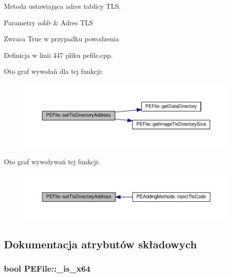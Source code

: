 Metoda ustawiająca adres tablicy T\-L\-S. 


\begin{DoxyParams}{Parametry}
{\em addr} & Adres T\-L\-S \\
\hline
\end{DoxyParams}
\begin{DoxyReturn}{Zwraca}
True w przypadku powodzenia 
\end{DoxyReturn}


Definicja w linii 447 pliku pefile.\-cpp.



Oto graf wywołań dla tej funkcji\-:
\nopagebreak
\begin{figure}[H]
\begin{center}
\leavevmode
\includegraphics[width=350pt]{class_p_e_file_a6cd64df26158260f265b26e40b3b5dea_cgraph}
\end{center}
\end{figure}




Oto graf wywoływań tej funkcji\-:
\nopagebreak
\begin{figure}[H]
\begin{center}
\leavevmode
\includegraphics[width=350pt]{class_p_e_file_a6cd64df26158260f265b26e40b3b5dea_icgraph}
\end{center}
\end{figure}




\subsection{Dokumentacja atrybutów składowych}
\hypertarget{class_p_e_file_a28a6e9fe7d586a07fc2094076293216e}{
\subsubsection[{\-\_\-is\-\_\-x64}]{\setlength{\rightskip}{0pt plus 5cm}bool P\-E\-File\-::\-\_\-is\-\_\-x64\hspace{0.3cm}{\ttfamily [private]}}}\label{class_p_e_file_a28a6e9fe7d586a07fc2094076293216e}


